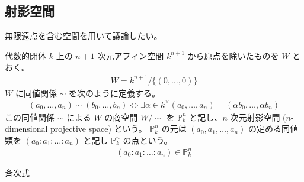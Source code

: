 \documentclass[uplatex,dvipdfmx,a4paper,11pt]{jlreq}
\newcommand{\PP}{\mathbb{P}}
\numberwithin{equation}{section}
\theoremstyle{definition}
\begin{document}
\subsection{射影空間}
無限遠点を含む空間を用いて議論したい。
\begin{definition}[射影空間]
  代数的閉体 $k$ 上の $n + 1$ 次元アフィン空間 $k^{n+1}$ から原点を除いたものを $W$ とおく。
  \begin{align}
    W = k^{n+1}/\lbrace(0,\ldots,0)\rbrace
  \end{align}
  $W$ に同値関係 $\sim$ を次のように定義する。
  \begin{align}
    (a_0,\ldots,a_n)\sim(b_0,\ldots,b_n) \iff \exists\alpha\in k^\times (a_0,\ldots,a_n) = (\alpha b_0,\ldots,\alpha b_n)
  \end{align}
  この同値関係 $\sim$ による $W$ の商空間 $W/\sim$ を $\PP_k^n$ と記し、$n$ 次元射影空間 ($n$-dimensional projective space) という。
  $\PP_k^n$ の元は $(a_0, a_1, \ldots, a_n)$ の定める同値類を $(a_0 : a_1 : \ldots : a_n)$ と記し $\PP_k^n$ の点という。
  \begin{align}
    (a_0 : a_1 : \ldots : a_n)\in\PP_k^n
  \end{align}
\end{definition}
斉次式
\end{document}
